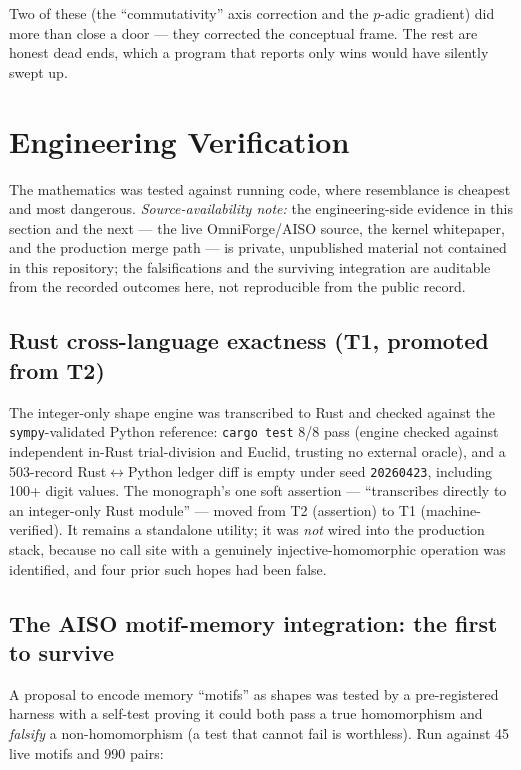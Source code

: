 \documentclass[11pt,a4paper]{article}
\newcommand{\seed}{\texttt{20260423}}
\newcommand{\TT}{\textsf{T1}}
\newcommand{\Tw}{\textsf{T2}}
\theoremstyle{definition}
\theoremstyle{plain}
\begin{document}
\noindent Two of these (the ``commutativity'' axis correction and the $p$-adic gradient) did more
than close a door --- they corrected the conceptual frame. The rest are honest dead ends, which a
program that reports only wins would have silently swept up.

\section{Engineering Verification}\label{sec:engineering}

The mathematics was tested against running code, where resemblance is cheapest and most dangerous.
\emph{Source-availability note:} the engineering-side evidence in this section and the next ---
the live OmniForge/AISO source, the kernel whitepaper, and the production merge path --- is private,
unpublished material not contained in this repository; the falsifications and the surviving
integration are auditable from the recorded outcomes here, not reproducible from the public record.

\subsection{Rust cross-language exactness (\TT, promoted from \Tw)}
The integer-only shape engine was transcribed to Rust and checked against the
\texttt{sympy}-validated Python reference: \texttt{cargo test} 8/8 pass (engine checked against
independent in-Rust trial-division and Euclid, trusting no external oracle), and a 503-record
Rust$\leftrightarrow$Python ledger diff is empty under seed \seed, including 100+ digit values. The
monograph's one soft assertion --- ``transcribes directly to an integer-only Rust module'' ---
moved from \Tw{} (assertion) to \TT{} (machine-verified). It remains a standalone utility; it was
\emph{not} wired into the production stack, because no call site with a genuinely
injective-homomorphic operation was identified, and four prior such hopes had been false.

\subsection{The AISO motif-memory integration: the first to survive}
A proposal to encode memory ``motifs'' as shapes was tested by a pre-registered harness with a
self-test proving it could both pass a true homomorphism and \emph{falsify} a non-homomorphism (a
test that cannot fail is worthless). Run against 45 live motifs and 990 pairs:
\end{document}
